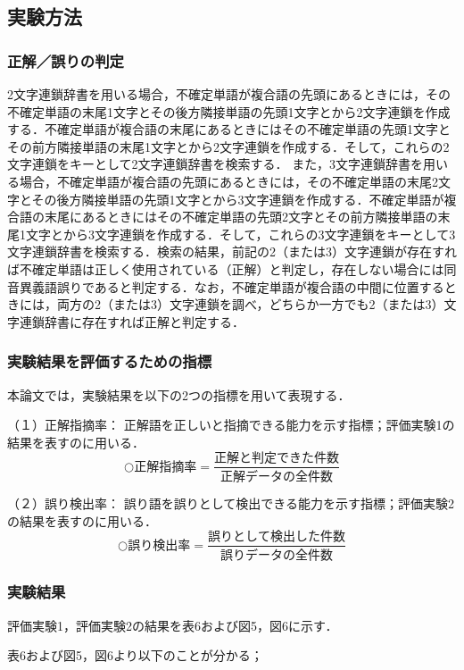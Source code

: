 \subsection{実験方法}
\subsubsection{正解／誤りの判定}
2文字連鎖辞書を用いる場合，不確定単語が複合語の先頭にあるときには，その不確定単語の末尾1文字とその後方隣接単語の先頭1文字とから2文字連鎖を作成する．不確定単語が複合語の末尾にあるときにはその不確定単語の先頭1文字とその前方隣接単語の末尾1文字とから2文字連鎖を作成する．そして，これらの2文字連鎖をキーとして2文字連鎖辞書を検索する．
また，3文字連鎖辞書を用いる場合，不確定単語が複合語の先頭にあるときには，その不確定単語の末尾2文字とその後方隣接単語の先頭1文字とから3文字連鎖を作成する．不確定単語が複合語の末尾にあるときにはその不確定単語の先頭2文字とその前方隣接単語の末尾1文字とから3文字連鎖を作成する．そして，これらの3文字連鎖をキーとして3文字連鎖辞書を検索する．検索の結果，前記の2（または3）文字連鎖が存在すれば不確定単語は正しく使用されている（正解）と判定し，存在しない場合には同音異義語誤りであると判定する．なお，不確定単語が複合語の中間に位置するときには，両方の2（または3）文字連鎖を調べ，どちらか一方でも2（または3）文字連鎖辞書に存在すれば正解と判定する．
\subsubsection{実験結果を評価するための指標}
本論文では，実験結果を以下の2つの指標を用いて表現する．
\begin{description}
\item{（１）正解指摘率：}
正解語を正しいと指摘できる能力を示す指標；評価実験1の結果を表すのに用いる．
\[ ○正解指摘率 = \frac{正解と判定できた件数}{正解データの全件数} \]
\item{（２）誤り検出率：}
誤り語を誤りとして検出できる能力を示す指標；評価実験2の結果を表すのに用いる．
\[ ○誤り検出率 = \frac{誤りとして検出した件数}{誤りデータの全件数} \]
\end{description}

\subsubsection{実験結果}

評価実験1，評価実験2の結果を表6および図5，図6に示す．


\indent
表6および図5，図6より以下のことが分かる；

